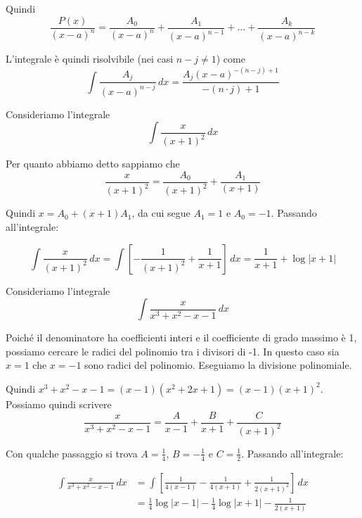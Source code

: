 Quindi
\begin{equation*}
\frac{P(x)}{(x-a)^n} = \frac{A_0}{(x-a)^n} + \frac{A_1}{(x-a)^{n-1}} + \ldots + \frac{A_k}{(x-a)^{n-k}}
\end{equation*}

L'integrale è quindi risolvibile (nei casi $n-j \neq 1$) come
\begin{equation*}
\int \frac{A_j}{(x-a)^{n-j}} \, dx = \frac{A_j (x-a)^{-(n-j)+1}}{-(n \cdot j) + 1}
\end{equation*}

\begin{example}
Consideriamo l'integrale
\begin{equation*}
\int \frac{x}{(x+1)^2} \, dx
\end{equation*}

Per quanto abbiamo detto sappiamo che
\begin{equation*}
\frac{x}{(x+1)^2} = \frac{A_0}{(x+1)^2} + \frac{A_1}{(x+1)}
\end{equation*}

Quindi $x = A_0 + (x+1)A_1$, da cui segue $A_1 = 1$ e $A_0 = -1$. Passando all'integrale:

\begin{equation*}
\int \frac{x}{(x+1)^2} \, dx = \int \left[ - \frac{1}{(x+1)^2} + \frac{1}{x+1} \right] \, dx = \frac{1}{x+1} + \log|x+1|
\end{equation*}
\end{example}

\begin{example}
Consideriamo l'integrale
\begin{equation*}
\int \frac{x}{x^3+x^2-x-1} \, dx
\end{equation*}

Poiché il denominatore ha coefficienti interi e il coefficiente di grado massimo è 1, possiamo cercare le radici del polinomio tra i divisori di -1. In questo caso sia $x = 1$ che $x = -1$ sono radici del polinomio. Eseguiamo la divisione polinomiale.

\begin{center}
\end{center}

Quindi $x^3 + x^2 - x - 1 = (x-1)(x^2+2x+1) = (x-1)(x+1)^2$. Possiamo quindi scrivere
\begin{equation*}
\frac{x}{x^3+x^2-x-1} = \frac{A}{x-1} + \frac{B}{x+1} + \frac{C}{(x+1)^2}
\end{equation*}

Con qualche passaggio si trova $A = \frac{1}{4}$, $B = -\frac{1}{4}$ e $C = \frac{1}{2}$. Passando all'integrale:

\begin{align*}
\int \frac{x}{x^3+x^2-x-1} \, dx &= \int \left[\frac{1}{4(x-1)} - \frac{1}{4(x+1)} + \frac{1}{2(x+1)^2} \right] \, dx \\
&= \frac{1}{4} \log |x-1| - \frac{1}{4} \log |x+1| - \frac{1}{2(x+1)}
\end{align*}
\end{example}

